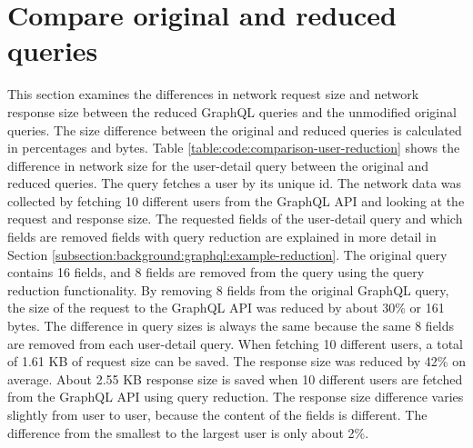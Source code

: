 \section{Compare original and reduced queries}

This section examines the differences in network request size and network response size between the reduced GraphQL queries and the unmodified original queries. The size difference between the original and reduced queries is calculated in percentages and bytes. Table \ref{table:code:comparison-user-reduction} shows the difference in network size for the user-detail query between the original and reduced queries. The query fetches a user by its unique id. The network data was collected by fetching 10 different users from the GraphQL \ac{API} and looking at the request and response size. The requested fields of the user-detail query and which fields are removed fields with query reduction are explained in more detail in Section \ref{subsection:background:graphql:example-reduction}. The original query contains 16 fields, and 8 fields are removed from the query using the query reduction functionality. By removing 8 fields from the original GraphQL query, the size of the request to the GraphQL \ac{API} was reduced by about 30\% or 161 bytes. The difference in query sizes is always the same because the same 8 fields are removed from each user-detail query. When fetching 10 different users, a total of 1.61 KB of request size can be saved. The response size was reduced by 42\% on average. About 2.55 KB response size is saved when 10 different users are fetched from the GraphQL \ac{API} using query reduction. The response size difference varies slightly from user to user, because the content of the fields is different. The difference from the smallest to the largest user is only about 2\%.

